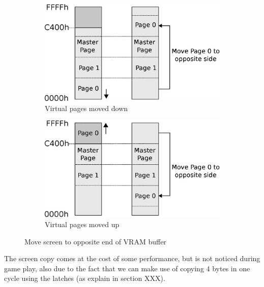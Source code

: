 \documentclass[book.tex]{subfiles}
\begin{document}
\begin{figure}
\centering
\begin{subfigure}{.5\textwidth}
  \centering
  \includegraphics[width=.9\textwidth]{imgs/drawings/Page_down_switch.eps}
  \caption{Virtual pages moved down}
  \label{fig:page0_down}
\end{subfigure}%
\begin{subfigure}{.5\textwidth}
  \centering
  \includegraphics[width=.9\textwidth]{imgs/drawings/Page_up_switch.eps}
    \caption{Virtual pages moved up}
  \label{fig:page0_up}
\end{subfigure}
\caption{Move screen to opposite end of VRAM buffer}
\label{fig:page_wrapping}
\end{figure}

The screen copy comes at the cost of some performance, but is not noticed during game play, also due to the fact that we can make use of copying 4 bytes in one cycle using the latches (as explain in section XXX).\\
\par
\begin{minipage}{\textwidth}
  
  \end{minipage}
  \label{ega_refresh}
  \par
\end{document}
